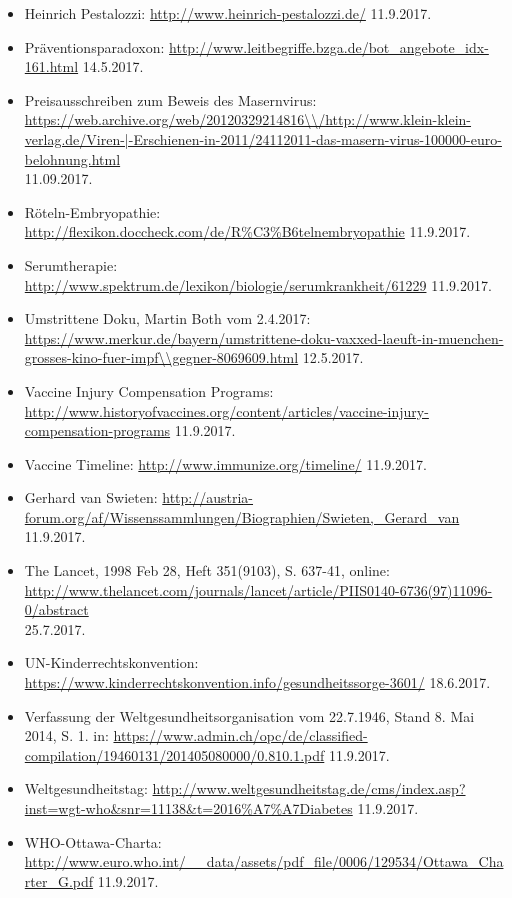 \documentclass[
    a4paper,
    12pt,
    hyphens,
    chapterprefix=true,
    headheight=33pt,
    footheight=29pt,
    headings=optiontohead,
]{scrartcl}
\begin{document}
{\begin{itemize}
\item{Heinrich Pestalozzi: \url{http://www.heinrich-pestalozzi.de/} 11.9.2017.}
\item{Präventionsparadoxon: \url{http://www.leitbegriffe.bzga.de/bot_angebote_idx-161.html} 14.5.2017.}
\item{Preisausschreiben zum Beweis des Masernvirus: \url{https://web.archive.org/web/20120329214816\\/http://www.klein-klein-verlag.de/Viren-|-Erschienen-in-2011/24112011-das-masern-virus-100000-euro-belohnung.html} \\11.09.2017.}
\item{Röteln-Embryopathie: \url{http://flexikon.doccheck.com/de/R\%C3\%B6telnembryopathie} 11.9.2017.}
\item{Serumtherapie: \url{http://www.spektrum.de/lexikon/biologie/serumkrankheit/61229} 11.9.2017.}
\item{Umstrittene Doku, Martin Both vom 2.4.2017: \url{https://www.merkur.de/bayern/umstrittene-doku-vaxxed-laeuft-in-muenchen-grosses-kino-fuer-impf\\gegner-8069609.html} 12.5.2017.}
\item{Vaccine Injury Compensation Programs: \url{http://www.historyofvaccines.org/content/articles/vaccine-injury-compensation-programs} 11.9.2017.}
\item{Vaccine Timeline: \url{http://www.immunize.org/timeline/} 11.9.2017.}
\item{Gerhard van Swieten: \url{http://austria-forum.org/af/Wissenssammlungen/Biographien/Swieten,_Gerard_van} 11.9.2017.}
\item{The Lancet, 1998 Feb 28, Heft 351(9103), S. 637-41, online: \url{http://www.thelancet.com/journals/lancet/article/PIIS0140-6736(97)11096-0/abstract}\\ 25.7.2017.}
\item{UN-Kinderrechtskonvention: \url{https://www.kinderrechtskonvention.info/gesundheitssorge-3601/} 18.6.2017.}
\item{Verfassung der Weltgesundheitsorganisation vom 22.7.1946, Stand 8. Mai 2014, S. 1. in: \url{https://www.admin.ch/opc/de/classified-compilation/19460131/201405080000/0.810.1.pdf} 11.9.2017.}
\item{Weltgesundheitstag: \url{http://www.weltgesundheitstag.de/cms/index.asp?inst=wgt-who&snr=11138&t=2016\%A7\%A7Diabetes} 11.9.2017.}
\item{WHO-Ottawa-Charta: \url{http://www.euro.who.int/__data/assets/pdf_file/0006/129534/Ottawa_Charter_G.pdf} 11.9.2017.}

\end{itemize}}
\end{document}

